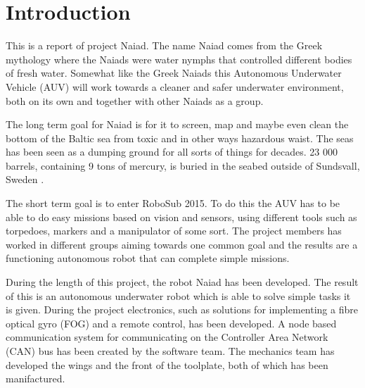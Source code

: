 \section{Introduction}
\noindent
This is a report of project Naiad. The name Naiad comes from the Greek mythology where the Naiads were water nymphs that controlled different bodies of fresh water\cite{naiadwiki}. Somewhat like the Greek Naiads this Autonomous Underwater Vehicle (AUV) will work towards a cleaner and safer underwater environment, both on its own and together with other Naiads as a group. 

The long term goal for Naiad is for it to screen, map and maybe even clean the bottom of the Baltic sea from toxic and in other ways hazardous waist. The seas has been seen as a dumping ground for all sorts of things for decades. 23 000 barrels, containing 9 tons of mercury, is buried in the seabed outside of Sundsvall, Sweden \cite{mercury_SR}. 

The short term goal is to enter RoboSub 2015. To do this the AUV has to be able to do easy missions based on vision and sensors, using different tools such as torpedoes, markers and a manipulator of some sort. The project members has worked in different groups aiming towards one common goal and the results are a functioning autonomous robot that can complete simple missions. 

During the length of this project, the robot Naiad has been developed. The result of this is an autonomous underwater robot which is able to solve simple tasks it is given. During the project electronics, such as solutions for implementing a fibre optical gyro (FOG) and a remote control, has been developed. A node based communication system for communicating on the Controller Area Network (CAN) bus has been created by the software team. The mechanics team has developed the wings and the front of the toolplate, both of which has been manifactured. 